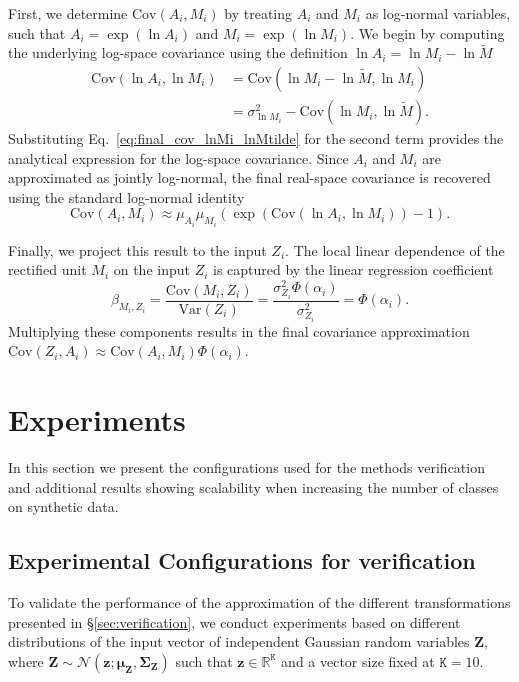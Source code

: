 \documentclass{uai2026} %
\begin{document}
First, we determine $\text{Cov}(A_i, M_i)$ by treating $A_i$ and $M_i$ as log-normal variables, such that $A_i = \exp(\ln A_i)$ and $M_i = \exp(\ln M_i)$. We begin by computing the underlying log-space covariance using the definition $\ln A_i = \ln M_i - \ln \tilde{M}$
\begin{align*}
\text{Cov}(\ln A_i, \ln M_i) &= \text{Cov}(\ln M_i - \ln \tilde{M}, \ln M_i) \\
&= \sigma_{\ln M_i}^2 - \text{Cov}(\ln M_i, \ln \tilde{M}).
\end{align*}
Substituting Eq.~\eqref{eq:final_cov_lnMi_lnMtilde} for the second term provides the analytical expression for the log-space covariance. Since $A_i$ and $M_i$ are approximated as jointly log-normal, the final real-space covariance is recovered using the standard log-normal identity
\begin{equation*}
\text{Cov}(A_i, M_i) \approx \mu_{A_i} \mu_{M_i} (\exp(\text{Cov}(\ln A_i, \ln M_i)) - 1).
\end{equation*}

Finally, we project this result to the input $Z_i$. The local linear dependence of the rectified unit $M_i$ on the input $Z_i$ is captured by the linear regression coefficient
\begin{equation*}
\beta_{M_i, Z_i} = \frac{\text{Cov}(M_i, Z_i)}{\text{Var}(Z_i)} = \frac{\sigma_{Z_i}^2 \Phi(\alpha_i)}{\sigma_{Z_i}^2} = \Phi(\alpha_i).
\end{equation*}
Multiplying these components results in the final covariance approximation $\text{Cov}(Z_i, A_i) \approx \text{Cov}(A_i, M_i) \Phi(\alpha_i)$.

\section{Experiments}

In this section we present the configurations used for the methods verification and additional results showing scalability when increasing the number of classes on synthetic data.

\subsection{Experimental Configurations for verification}
\label{app:experimental_configurations}

To validate the performance of the approximation of the different transformations presented in \S\ref{sec:verification}, we conduct experiments based on different distributions of the input vector of independent Gaussian random variables $\bm{Z}$, where $\bm{Z} \sim\mathcal{N}(\bm{z};\bm{\mu}_{\bm{Z}},\bm{\Sigma}_{\bm{Z}})$ such that $\bm{z} \in \mathbb{R}^{\mathtt{K}}$ and a vector size fixed at $\mathtt{K}=10$.
\end{document}
